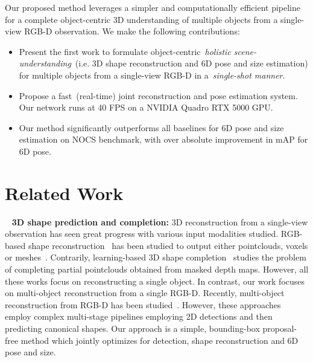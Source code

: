 \documentclass[letter, 10pt, conference]{ieeeconf}
\begin{document}
Our proposed method leverages a simpler and computationally efficient pipeline for a complete object-centric 3D understanding of multiple objects from a single-view RGB-D observation. We make the following contributions:
\begin{itemize}
\item Present the first work to formulate object-centric~\textit{holistic scene-understanding}~(i.e. 3D shape reconstruction and 6D pose and size estimation) for multiple objects from a single-view RGB-D in a~\textit{single-shot manner}. 
\item Propose a fast~(real-time) joint reconstruction and pose estimation system. Our network runs at 40 FPS on a NVIDIA Quadro RTX 5000 GPU.
\item Our method significantly outperforms all baselines for 6D pose and size estimation on NOCS benchmark, with over  absolute improvement in mAP for 6D pose.
\end{itemize}
\section{Related Work}~\label{sec:A}
\textbf{3D shape prediction and completion:} 3D reconstruction from a single-view observation has seen great progress with various input modalities studied. RGB-based shape reconstruction~\cite{fan2017point, choy20163d, groueix2018} has been studied to output either pointclouds, voxels or meshes~\cite{park2019deepsdf, mescheder2019occupancy, chen2019learning}. Contrarily, learning-based 3D shape completion~\cite{Yang18, varley2017shape, yuan2018pcn} studies the problem of completing partial pointclouds obtained from masked depth maps. However, all these works focus on reconstructing a single object. In contrast, our work focuses on multi-object reconstruction from a single RGB-D. Recently, multi-object reconstruction from RGB-D has been studied~\cite{engelmann2021points, runz2020frodo, gkioxari2019mesh}. However, these approaches employ complex multi-stage pipelines employing 2D detections  and then predicting canonical shapes. Our approach is a simple, bounding-box proposal-free method which jointly optimizes for detection, shape reconstruction and 6D pose and size. 
\end{document}
